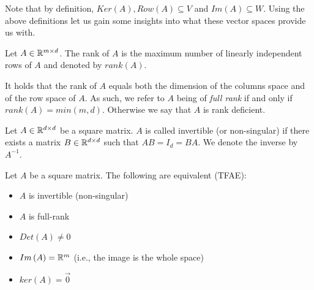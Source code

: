 Note that by definition, $Ker\left(A\right), Row\left(A\right)\subseteq V$ and $Im\left(A\right)\subseteq W$. Using the above definitions let us gain some insights into what these vector spaces provide us with.\\

\begin{definition}
Let $A\in\mathbb{R}^{m\times d}$. The rank of $A$ is the maximum number of linearly independent rows of $A$ and denoted by $rank\left(A\right)$.
\end{definition}

It holds that the rank of $A$ equals both the dimension of the columns space and of the row space of $A$. As such, we refer to $A$ being of \textit{full rank} if and only if $rank\left(A\right)=min\left(m,d\right)$. Otherwise we say that $A$ is rank deficient.\\

\begin{definition}
Let $A\in\mathbb{R}^{d\times d}$ be a square matrix. $A$ is called  invertible (or non-singular) if there exists a matrix $B\in\mathbb{R}^{d\times d}$ such that $AB=I_d=BA$. We denote the inverse by $A^{-1}$.
\end{definition}

\begin{claim}
Let $A$ be a square matrix. The following are equivalent (TFAE):
\begin{itemize}
	\item $A$ is invertible (non-singular)
	\item $A$ is full-rank
	\item $Det\left(A\right)\neq 0$
	\item $Im\left(A\right)=\mathbb{R}^m$ (i.e., the image is the whole space)
	\item $ker\left(A\right)=\vec 0$
\end{itemize}
\end{claim}

